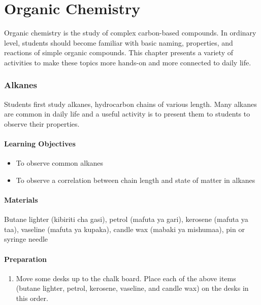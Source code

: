 \chapter{Organic Chemistry}

Organic chemistry is the study of complex carbon-based compounds. In ordinary level, students should become familiar with basic naming, properties, and reactions of simple organic compounds. This chapter presents a variety of activities to make these topics more hands-on and more connected to daily life.

\subsection{Alkanes}

Students first study alkanes, hydrocarbon chains of various length. Many alkanes are common in daily life and a useful activity is to present them to students to observe their properties.

\subsubsection*{Learning Objectives}
\begin{itemize}
\item{To observe common alkanes}
\item{To observe a correlation between chain length and state of matter in alkanes}
\end{itemize}

\subsubsection*{Materials}
Butane lighter (kibiriti cha gasi), petrol (mafuta ya gari), kerosene (mafuta ya taa), vaseline (mafuta ya kupaka), candle wax (mabaki ya mishumaa), pin or syringe needle

\subsubsection*{Preparation}
\begin{enumerate}
\item{Move some desks up to the chalk board. Place each of the above items (butane lighter, petrol, kerosene, vaseline, and candle wax) on the desks in this order.}
\end{enumerate}

